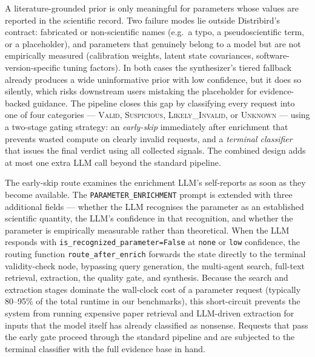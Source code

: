 \documentclass[11pt,a4paper]{article}
\begin{document}
A literature-grounded prior is only meaningful for parameters whose values are reported in the scientific record. Two failure modes lie outside Distribird's contract: fabricated or non-scientific names (e.g.\ a typo, a pseudoscientific term, or a placeholder), and parameters that genuinely belong to a model but are not empirically measured (calibration weights, latent state covariances, software-version-specific tuning factors). In both cases the synthesizer's tiered fallback already produces a wide uninformative prior with low confidence, but it does so silently, which risks downstream users mistaking the placeholder for evidence-backed guidance. The pipeline closes this gap by classifying every request into one of four categories --- \textsc{Valid}, \textsc{Suspicious}, \textsc{Likely\_Invalid}, or \textsc{Unknown} --- using a two-stage gating strategy: an \emph{early-skip} immediately after enrichment that prevents wasted compute on clearly invalid requests, and a \emph{terminal classifier} that issues the final verdict using all collected signals. The combined design adds at most one extra LLM call beyond the standard pipeline.

The early-skip route examines the enrichment LLM's self-reports as soon as they become available. The \texttt{PARAMETER\_ENRICHMENT} prompt is extended with three additional fields --- whether the LLM recognises the parameter as an established scientific quantity, the LLM's confidence in that recognition, and whether the parameter is empirically measurable rather than theoretical. When the LLM responds with \texttt{is\_recognized\_parameter=False} at \texttt{none} or \texttt{low} confidence, the routing function \texttt{route\_after\_enrich} forwards the state directly to the terminal validity-check node, bypassing query generation, the multi-agent search, full-text retrieval, extraction, the quality gate, and synthesis. Because the search and extraction stages dominate the wall-clock cost of a parameter request (typically 80--95\% of the total runtime in our benchmarks), this short-circuit prevents the system from running expensive paper retrieval and LLM-driven extraction for inputs that the model itself has already classified as nonsense. Requests that pass the early gate proceed through the standard pipeline and are subjected to the terminal classifier with the full evidence base in hand.
\end{document}
